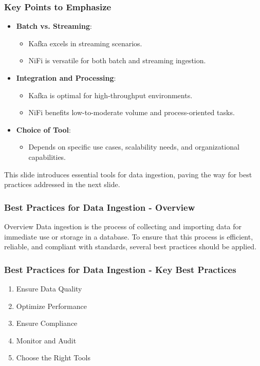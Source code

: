 \documentclass[aspectratio=169]{beamer}
\begin{document}
\begin{frame}[fragile]
    \frametitle{Key Points to Emphasize}
    
    \begin{itemize}
        \item \textbf{Batch vs. Streaming}:
            \begin{itemize}
                \item Kafka excels in streaming scenarios.
                \item NiFi is versatile for both batch and streaming ingestion.
            \end{itemize}
        \item \textbf{Integration and Processing}:
            \begin{itemize}
                \item Kafka is optimal for high-throughput environments.
                \item NiFi benefits low-to-moderate volume and process-oriented tasks.
            \end{itemize}
        \item \textbf{Choice of Tool}:
            \begin{itemize}
                \item Depends on specific use cases, scalability needs, and organizational capabilities.
            \end{itemize}
    \end{itemize}
    
    This slide introduces essential tools for data ingestion, paving the way for best practices addressed in the next slide.
\end{frame}

\begin{frame}[fragile]
    \frametitle{Best Practices for Data Ingestion - Overview}
    \begin{block}{Overview}
        Data ingestion is the process of collecting and importing data for immediate use or storage in a database. To ensure that this process is efficient, reliable, and compliant with standards, several best practices should be applied.
    \end{block}
\end{frame}

\begin{frame}[fragile]
    \frametitle{Best Practices for Data Ingestion - Key Best Practices}
    \begin{enumerate}
        \item Ensure Data Quality
        \item Optimize Performance
        \item Ensure Compliance
        \item Monitor and Audit
        \item Choose the Right Tools
    \end{enumerate}
\end{frame}
\end{document}
